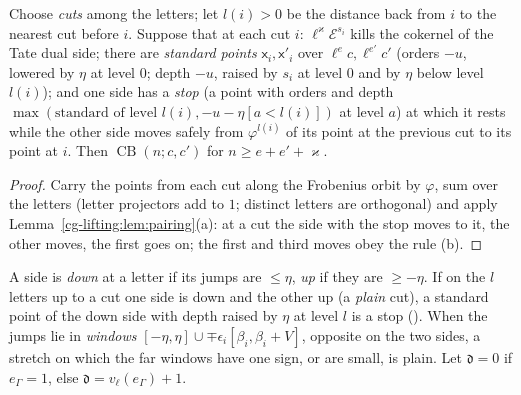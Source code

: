 \begin{proposition}
\label{cg-lifting:prop:walk}
Choose \emph{cuts} among the letters; let $l(i)>0$ be the distance back from $i$ to the nearest cut before $i$.
Suppose that at each cut $i$: $\ell^\varkappa\mathcal E^{s_i}$ kills the cokernel of the Tate dual side; there
are \emph{standard points} $\mathsf x_i,\mathsf x'_i$ over $\ell^ec,\ell^{e'}c'$ (orders $-u$, lowered by $\eta$ at
level $0$; depth $-u$, raised by $s_i$ at level $0$ and by $\eta$ below level $l(i)$); and one side
has a \emph{stop} (a point with orders and depth $\max(\text{standard of level }l(i),-u-\eta[a<l(i)])$ at level $a$) at which
it rests while the other side moves safely from $\varphi^{l(i)}$ of its point at the previous cut to
its point at $i$. Then $\operatorname{CB}(n;c,c')$ for $n\ge e+e'+\varkappa$.
\end{proposition}

\begin{proof}
Carry the points from each cut along the Frobenius orbit by $\varphi$, sum over the letters (letter
projectors add to $1$; distinct letters are orthogonal) and apply
Lemma~\ref{cg-lifting:lem:pairing}(a): at a cut the side with the stop moves to it, the other moves,
the first goes on; the first and third moves obey the rule (b).
\end{proof}

A side is \emph{down} at a letter if its jumps are $\le\eta$, \emph{up} if they are $\ge-\eta$. If
on the $l$ letters up to a cut one side is down and the other up (a \emph{plain} cut), a standard
point of the down side with depth raised by $\eta$ at level $l$ is a stop
(). When the
jumps lie in \emph{windows} $[-\eta,\eta]\cup\mp\epsilon_i[\beta_i,\beta_i+V]$, opposite on the two
sides, a stretch on which the far windows have one sign, or are small,
is plain. Let $\mathfrak d=0$ if $e_\Gamma=1$, else $\mathfrak d=v_\ell(e_\Gamma)+1$.

